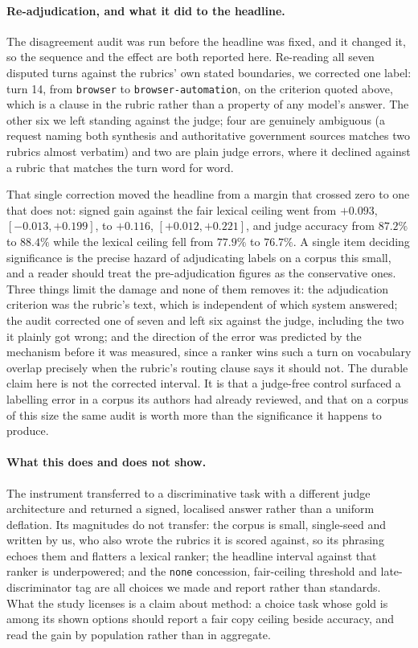 \paragraph{Re-adjudication, and what it did to the headline.} The disagreement audit was run before the headline was fixed, and it changed it, so the sequence and the effect are both reported here. Re-reading all seven disputed turns against the rubrics' own stated boundaries, we corrected one label: turn 14, from \texttt{browser} to \texttt{browser-automation}, on the criterion quoted above, which is a clause in the rubric rather than a property of any model's answer. The other six we left standing against the judge; four are genuinely ambiguous (a request naming both synthesis and authoritative government sources matches two rubrics almost verbatim) and two are plain judge errors, where it declined against a rubric that matches the turn word for word.

That single correction moved the headline from a margin that crossed zero to one that does not: signed gain against the fair lexical ceiling went from $+0.093$, $[-0.013,+0.199]$, to $+0.116$, $[+0.012,+0.221]$, and judge accuracy from $87.2\%$ to $88.4\%$ while the lexical ceiling fell from $77.9\%$ to $76.7\%$. A single item deciding significance is the precise hazard of adjudicating labels on a corpus this small, and a reader should treat the pre-adjudication figures as the conservative ones. Three things limit the damage and none of them removes it: the adjudication criterion was the rubric's text, which is independent of which system answered; the audit corrected one of seven and left six against the judge, including the two it plainly got wrong; and the direction of the error was predicted by the mechanism before it was measured, since a ranker wins such a turn on vocabulary overlap precisely when the rubric's routing clause says it should not. The durable claim here is not the corrected interval. It is that a judge-free control surfaced a labelling error in a corpus its authors had already reviewed, and that on a corpus of this size the same audit is worth more than the significance it happens to produce.

\paragraph{What this does and does not show.} The instrument transferred to a discriminative task with a different judge architecture and returned a signed, localised answer rather than a uniform deflation. Its magnitudes do not transfer: the corpus is small, single-seed and written by us, who also wrote the rubrics it is scored against, so its phrasing echoes them and flatters a lexical ranker; the headline interval against that ranker is underpowered; and the \texttt{none} concession, fair-ceiling threshold and late-discriminator tag are all choices we made and report rather than standards. What the study licenses is a claim about method: a choice task whose gold is among its shown options should report a fair copy ceiling beside accuracy, and read the gain by population rather than in aggregate.

